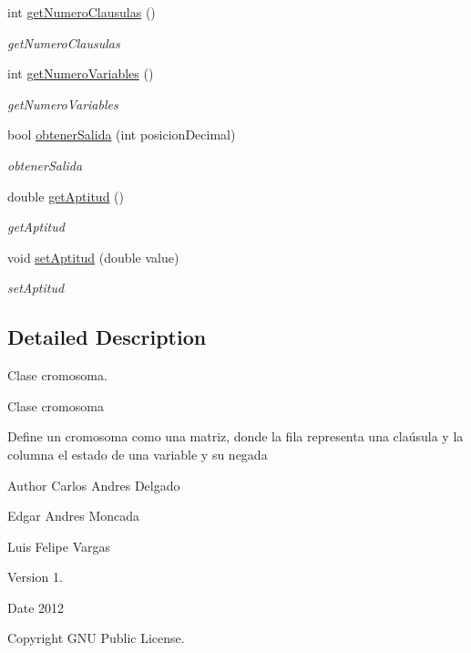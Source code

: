 \begin{DoxyCompactItemize}
\item 
int \hyperlink{classCromosoma_a53e4a3cda8f7a0b2233f0219579f7cc3}{get\-Numero\-Clausulas} ()
\begin{DoxyCompactList}\small\item\em get\-Numero\-Clausulas \end{DoxyCompactList}\item 
int \hyperlink{classCromosoma_a825104a1dd2a7595d119907c84fd2fd1}{get\-Numero\-Variables} ()
\begin{DoxyCompactList}\small\item\em get\-Numero\-Variables \end{DoxyCompactList}\item 
bool \hyperlink{classCromosoma_a8a75eb52e417f9c050c32969b56984e7}{obtener\-Salida} (int posicion\-Decimal)
\begin{DoxyCompactList}\small\item\em obtener\-Salida \end{DoxyCompactList}\item 
double \hyperlink{classCromosoma_a280c8232e95aec0c8dd627cd579abec6}{get\-Aptitud} ()
\begin{DoxyCompactList}\small\item\em get\-Aptitud \end{DoxyCompactList}\item 
void \hyperlink{classCromosoma_a158f2fe672e3232ebf07a5724a15fc2e}{set\-Aptitud} (double value)
\begin{DoxyCompactList}\small\item\em set\-Aptitud \end{DoxyCompactList}\end{DoxyCompactItemize}


\subsection{Detailed Description}
Clase cromosoma. 

\begin{DoxyVerb}Clase cromosoma
\end{DoxyVerb}


Define un cromosoma como una matriz, donde la fila representa una claúsula y la columna el estado de una variable y su negada \begin{DoxyAuthor}{Author}
Carlos Andres Delgado 

Edgar Andres Moncada 

Luis Felipe Vargas 
\end{DoxyAuthor}
\begin{DoxyVersion}{Version}
1. 
\end{DoxyVersion}
\begin{DoxyDate}{Date}
2012 
\end{DoxyDate}
\begin{DoxyCopyright}{Copyright}
G\-N\-U Public License. 
\end{DoxyCopyright}


